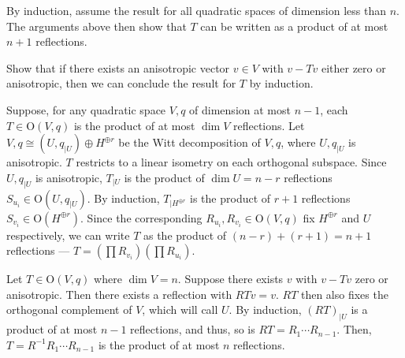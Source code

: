 \documentclass[12 pt, letterpaper]{hmcpset}
\begin{document}
\pagebreak

\begin{problem}[(3)]
	By induction, assume the result for all quadratic spaces of dimension less than  $n$. The arguments above then show that $T$ can be written as a product of at most $n + 1$ reflections.

	Show that if there exists an anisotropic vector $v \in V$ with $v - Tv$ either zero or anisotropic, then we can conclude the result for $T$ by induction.
\end{problem}

\begin{solution}
	Suppose, for any quadratic space $V, q$ of dimension at most $n - 1$, each $T \in \mathrm{O}(V, q)$ is the product of at most $\dim V$ reflections. Let $V, q \cong (U, q_{\mid U}) \oplus H^{\oplus r}$ be the Witt decomposition of $V, q$, where $U, q_{\mid U}$ is anisotropic. $T$ restricts to a linear isometry on each orthogonal subspace. Since $U, q_{\mid U}$ is anisotropic, $T_{\mid U}$ is the product of $\dim U = n - r$ reflections $S_{u_{i}} \in \mathrm{O}(U, q_{\mid U})$. By induction, $T_{\mid H^{\oplus r}}$ is the product of $r + 1$ reflections $S_{v_{i}} \in \mathrm{O}(H^{\oplus r})$. Since the corresponding $R_{u_{i}}, R_{v_{i}} \in \mathrm{O}(V, q)$ fix $H^{\oplus r}$ and $U$ respectively, we can write $T$ as the product of $(n - r) + (r + 1) = n + 1$ reflections ---  $T = \left ( \prod R_{v_{i}} \right ) \left ( \prod R_{u_{i}} \right )$.

	Let $T \in \mathrm{O}(V, q)$ where $\dim V = n$. Suppose there exists $v$ with $v - Tv$ zero or anisotropic. Then there exists a reflection with $RTv = v$. $RT$ then also fixes the orthogonal complement of $V$, which will call $U$. By induction, $(RT)_{\mid U}$ is a product of at most $n - 1$ reflections, and thus, so is $RT = R_{1} \cdots R_{n - 1}$. Then, $T = R^{-1} R_{1} \cdots R_{n - 1}$ is the product of at most $n$ reflections.
\end{solution}

\pagebreak
\end{document}
